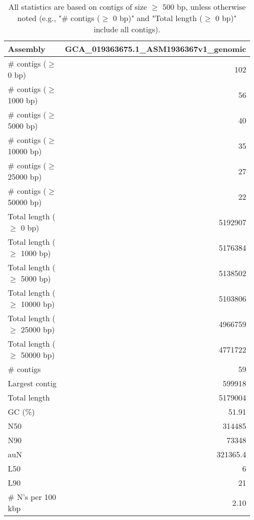 \documentclass[12pt,a4paper]{article}
\begin{document}
\begin{table}[ht]
\begin{center}
\caption{All statistics are based on contigs of size $\geq$ 500 bp, unless otherwise noted (e.g., "\# contigs ($\geq$ 0 bp)" and "Total length ($\geq$ 0 bp)" include all contigs).}
\begin{tabular}{|l*{1}{|r}|}
\hline
Assembly & GCA\_019363675.1\_ASM1936367v1\_genomic \\ \hline
\# contigs ($\geq$ 0 bp) & 102 \\ \hline
\# contigs ($\geq$ 1000 bp) & 56 \\ \hline
\# contigs ($\geq$ 5000 bp) & 40 \\ \hline
\# contigs ($\geq$ 10000 bp) & 35 \\ \hline
\# contigs ($\geq$ 25000 bp) & 27 \\ \hline
\# contigs ($\geq$ 50000 bp) & 22 \\ \hline
Total length ($\geq$ 0 bp) & 5192907 \\ \hline
Total length ($\geq$ 1000 bp) & 5176384 \\ \hline
Total length ($\geq$ 5000 bp) & 5138502 \\ \hline
Total length ($\geq$ 10000 bp) & 5103806 \\ \hline
Total length ($\geq$ 25000 bp) & 4966759 \\ \hline
Total length ($\geq$ 50000 bp) & 4771722 \\ \hline
\# contigs & 59 \\ \hline
Largest contig & 599918 \\ \hline
Total length & 5179004 \\ \hline
GC (\%) & 51.91 \\ \hline
N50 & 314485 \\ \hline
N90 & 73348 \\ \hline
auN & 321365.4 \\ \hline
L50 & 6 \\ \hline
L90 & 21 \\ \hline
\# N's per 100 kbp & 2.10 \\ \hline
\end{tabular}
\end{center}
\end{table}
\end{document}
